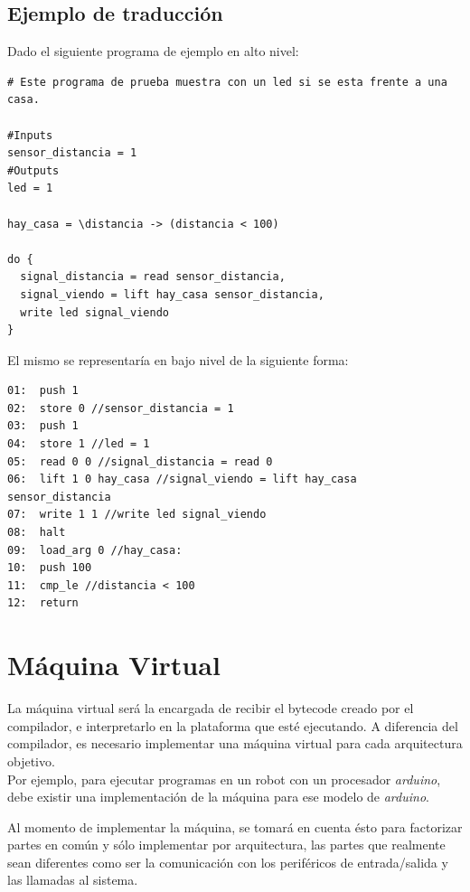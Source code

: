 \newpage
\subsection{Ejemplo de traducción}

Dado el siguiente programa de ejemplo en alto nivel:

\begin{verbatim}
# Este programa de prueba muestra con un led si se esta frente a una casa.

#Inputs
sensor_distancia = 1
#Outputs
led = 1

hay_casa = \distancia -> (distancia < 100)

do {
  signal_distancia = read sensor_distancia,
  signal_viendo = lift hay_casa sensor_distancia,
  write led signal_viendo
}
\end{verbatim}

El mismo se representaría en bajo nivel de la siguiente forma:

\begin{verbatim}
01:  push 1
02:  store 0 //sensor_distancia = 1
03:  push 1
04:  store 1 //led = 1
05:  read 0 0 //signal_distancia = read 0
06:  lift 1 0 hay_casa //signal_viendo = lift hay_casa sensor_distancia
07:  write 1 1 //write led signal_viendo
08:  halt
09:  load_arg 0 //hay_casa:
10:  push 100
11:  cmp_le //distancia < 100
12:  return
\end{verbatim}

\section{Máquina Virtual}

  La máquina virtual será la encargada de recibir el bytecode creado por
el compilador, e interpretarlo en la plataforma que esté ejecutando.
  A diferencia del compilador, es necesario implementar una máquina virtual
para cada arquitectura objetivo.\\

  Por ejemplo, para ejecutar programas en un robot
  con un procesador \emph{arduino}, debe
  existir una implementación de la máquina para ese modelo
  de \emph{arduino}.

  Al momento de implementar la máquina, se tomará en cuenta ésto para
  factorizar partes en común y sólo implementar por arquitectura, las
  partes que realmente sean diferentes como ser la comunicación con
  los periféricos de entrada/salida y las llamadas al sistema.

